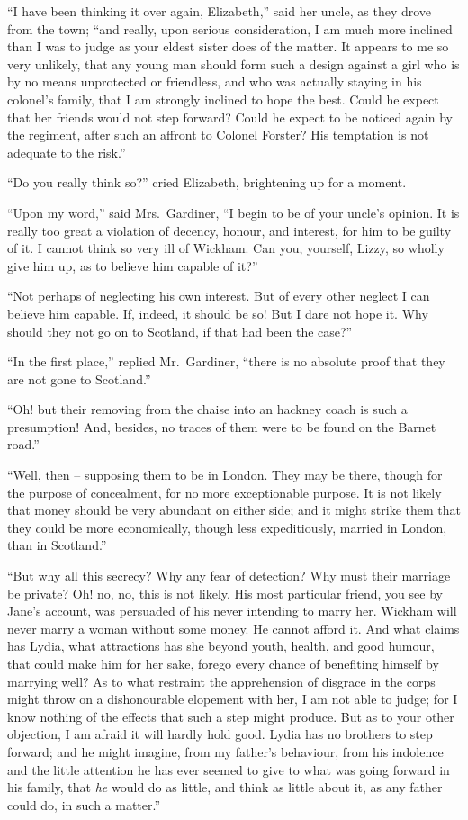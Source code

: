 
“I have been thinking it over again, Elizabeth,” said
her uncle, as they drove from the town; “and really,
upon serious consideration, I am much more inclined
than I was to judge as your eldest sister does of the matter.
It appears to me so very unlikely, that any young man
should form such a design against a girl who is by no
means unprotected or friendless, and who was actually
staying in his colonel’s family, that I am strongly inclined
to hope the best. Could he expect that her friends would
not step forward? Could he expect to be noticed again
by the regiment, after such an affront to Colonel Forster?
His temptation is not adequate to the risk.”

“Do you really think so?” cried Elizabeth, brightening
up for a moment.

“Upon my word,” said Mrs.\ Gardiner, “I begin to be
of your uncle’s opinion. It is really too great a violation
of decency, honour, and interest, for him to be guilty of
it. I cannot think so very ill of Wickham. Can you,
yourself, Lizzy, so wholly give him up, as to believe him
capable of it?”

“Not perhaps of neglecting his own interest. But of
every other neglect I can believe him capable. If, indeed,
it should be so! But I dare not hope it. Why should
they not go on to Scotland, if that had been the case?”

“In the first place,” replied Mr.\ Gardiner, “there is
no absolute proof that they are not gone to Scotland.”

“Oh! but their removing from the chaise into an
hackney coach is such a presumption! And, besides, no
traces of them were to be found on the Barnet road.”

“Well, then -- supposing them to be in London. They
may be there, though for the purpose of concealment,
for no more exceptionable purpose. It is not likely that
money should be very abundant on either side; and it
might strike them that they could be more economically,
though less expeditiously, married in London, than in
Scotland.”

“But why all this secrecy? Why any fear of detection?
Why must their marriage be private? Oh! no, no, this
is not likely. His most particular friend, you see by
Jane’s account, was persuaded of his never intending to
marry her. Wickham will never marry a woman without
some money. He cannot afford it. And what claims has
Lydia, what attractions has she beyond youth, health, and
good humour, that could make him for her sake, forego
every chance of benefiting himself by marrying well? As
to what restraint the apprehension of disgrace in the corps
might throw on a dishonourable elopement with her, I am
not able to judge; for I know nothing of the effects that
such a step might produce. But as to your other objection,
I am afraid it will hardly hold good. Lydia has no
brothers to step forward; and he might imagine, from
my father’s behaviour, from his indolence and the little
attention he has ever seemed to give to what was going
forward in his family, that \textit{he} would do as little, and
think as little about it, as any father could do, in such
a matter.”

